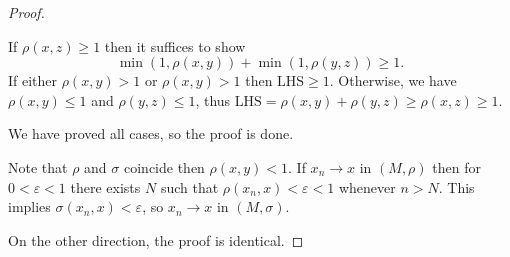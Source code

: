 \begin{enumerate}
\begin{proof}
\begin{itemize}
				If $\rho(x, z) \ge 1$ then it suffices to show
				 \[
				\min(1, \rho(x, y)) + \min(1, \rho(y, z))\ge 1
				.\] 
				If either $\rho(x, y) > 1$ or $\rho(x, y) > 1$ then $\text{LHS} \ge 1$. Otherwise, we have $\rho(x, y) \le 1$ and $\rho(y, z) \le 1$, thus $\text{LHS} = \rho(x, y) + \rho(y, z) \ge \rho(x, z) \ge 1$.

				We have proved all cases, so the proof is done.
			\end{itemize}
			Note that $\rho$ and $\sigma$ coincide then $\rho(x, y)<1$. If $x_n \to x$ in $(M, \rho)$ then for $0<\varepsilon<1$ there exists $N$ such that  $\rho(x_n, x) < \varepsilon < 1$ whenever $n > N$. This implies $\sigma(x_n, x) < \varepsilon$, so $x_n \to x $ in $(M, \sigma)$.

			On the other direction, the proof is identical.
		\end{proof}
		
		
		
		
\end{enumerate}
